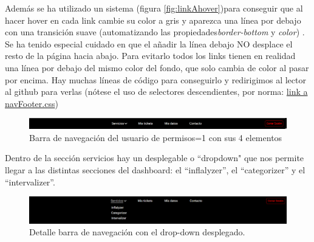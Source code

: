 \documentclass[a4paper,12pt]{report}
\begin{document}
	Además se ha utilizado un sistema (figura \ref{fig:linkAhover})para conseguir que al hacer hover en cada link cambie su color a gris y aparezca una línea por debajo con una transición suave (automatizando las propiedades\textit{border-bottom} y \textit{color}) . Se ha tenido especial cuidado en que el añadir la línea debajo NO desplace el resto de la página hacia abajo. Para evitarlo todos los links tienen en realidad una línea por debajo del mismo color del fondo, que solo cambia de color al pasar por encima. Hay muchas líneas de código para conseguirlo y redirigimos al lector al github para verlas (nótese el uso de selectores descendientes, por norma: \href{https://github.com/blackcub3s/mercApp/blob/main/APP%20WEB/__frontend__produccio__/app/css/dashboard/navFooter.css}{link a navFooter.css})
	
	\FloatBarrier
	\setlength{\abovecaptionskip}{3pt}
	\begin{figure}[H]
		\centering
		\caption{Barra de navegación del usuario de permisos=1 con sus 4 elementos}
		\includegraphics[width=1\linewidth]{img/barraNavegacioDashboardPERMISOS1}

		\label{fig:barranavegaciodashboardpermisos1}
	\end{figure}
	\FloatBarrier
	
	Dentro de la sección servicios hay un desplegable o ``dropdown" que nos permite llegar a las distintas secciones del dashboard: el ``inflalyzer'', el ``categorizer'' y el ``intervalizer''.
	
	\FloatBarrier
	\setlength{\belowcaptionskip}{3pt}
	\begin{figure}[H]
		\centering
		\caption{Detalle barra de navegación con el drop-down desplegado.}
		\includegraphics[width=1\linewidth]{img/barraNavegacioDashboardPERMISOS1dropDown}
		
		\label{fig:barranavegaciodashboardpermisos1dropdown}
	\end{figure}
	\FloatBarrier
	
\end{document}
